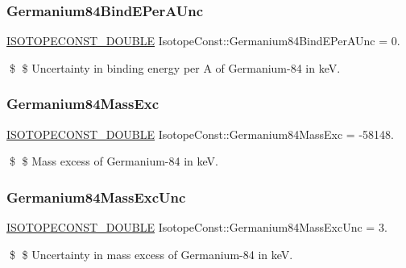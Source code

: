 \subsubsection{\texorpdfstring{Germanium84\+Bind\+E\+Per\+A\+Unc}{Germanium84BindEPerAUnc}}
{\footnotesize\ttfamily \mbox{\hyperlink{group___isotope_const-_macros_ga8f45a7272ce02c0b4c65c44636ed719a}{I\+S\+O\+T\+O\+P\+E\+C\+O\+N\+S\+T\+\_\+\+D\+O\+U\+B\+LE}} Isotope\+Const\+::\+Germanium84\+Bind\+E\+Per\+A\+Unc = 0.}

\$ \$ Uncertainty in binding energy per A of Germanium-\/84 in keV. \mbox{\label{group___isotope_const-_germanium-_ge84_ga5d582bf86650ed7083ed77302cb929c4}} 
\subsubsection{\texorpdfstring{Germanium84\+Mass\+Exc}{Germanium84MassExc}}
{\footnotesize\ttfamily \mbox{\hyperlink{group___isotope_const-_macros_ga8f45a7272ce02c0b4c65c44636ed719a}{I\+S\+O\+T\+O\+P\+E\+C\+O\+N\+S\+T\+\_\+\+D\+O\+U\+B\+LE}} Isotope\+Const\+::\+Germanium84\+Mass\+Exc = -\/58148.}

\$ \$ Mass excess of Germanium-\/84 in keV. \mbox{\label{group___isotope_const-_germanium-_ge84_gaba962b0a0340ba06cded97f805db1a83}} 
\subsubsection{\texorpdfstring{Germanium84\+Mass\+Exc\+Unc}{Germanium84MassExcUnc}}
{\footnotesize\ttfamily \mbox{\hyperlink{group___isotope_const-_macros_ga8f45a7272ce02c0b4c65c44636ed719a}{I\+S\+O\+T\+O\+P\+E\+C\+O\+N\+S\+T\+\_\+\+D\+O\+U\+B\+LE}} Isotope\+Const\+::\+Germanium84\+Mass\+Exc\+Unc = 3.}

\$ \$ Uncertainty in mass excess of Germanium-\/84 in keV. \mbox{\label{group___isotope_const-_germanium-_ge84_ga29216717d07c143e9f986cf472df5f5d}} 
